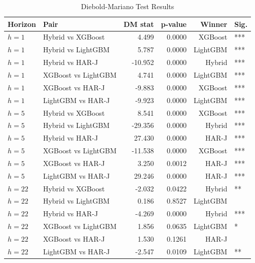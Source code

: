 \begin{table}[htbp]
\centering
\caption{Diebold-Mariano Test Results}
\label{tab:dm_tests}
\begin{tabular}{llrrrl}
\hline
Horizon & Pair & DM stat & p-value & Winner & Sig. \\
\hline
$h=1$ & Hybrid vs XGBoost & 4.499 & 0.0000 & XGBoost & *** \\
$h=1$ & Hybrid vs LightGBM & 5.787 & 0.0000 & LightGBM & *** \\
$h=1$ & Hybrid vs HAR-J & -10.952 & 0.0000 & Hybrid & *** \\
$h=1$ & XGBoost vs LightGBM & 4.741 & 0.0000 & LightGBM & *** \\
$h=1$ & XGBoost vs HAR-J & -9.883 & 0.0000 & XGBoost & *** \\
$h=1$ & LightGBM vs HAR-J & -9.923 & 0.0000 & LightGBM & *** \\
$h=5$ & Hybrid vs XGBoost & 8.541 & 0.0000 & XGBoost & *** \\
$h=5$ & Hybrid vs LightGBM & -29.356 & 0.0000 & Hybrid & *** \\
$h=5$ & Hybrid vs HAR-J & 27.430 & 0.0000 & HAR-J & *** \\
$h=5$ & XGBoost vs LightGBM & -11.538 & 0.0000 & XGBoost & *** \\
$h=5$ & XGBoost vs HAR-J & 3.250 & 0.0012 & HAR-J & *** \\
$h=5$ & LightGBM vs HAR-J & 29.246 & 0.0000 & HAR-J & *** \\
$h=22$ & Hybrid vs XGBoost & -2.032 & 0.0422 & Hybrid & ** \\
$h=22$ & Hybrid vs LightGBM & 0.186 & 0.8527 & LightGBM &  \\
$h=22$ & Hybrid vs HAR-J & -4.269 & 0.0000 & Hybrid & *** \\
$h=22$ & XGBoost vs LightGBM & 1.856 & 0.0635 & LightGBM & * \\
$h=22$ & XGBoost vs HAR-J & 1.530 & 0.1261 & HAR-J &  \\
$h=22$ & LightGBM vs HAR-J & -2.547 & 0.0109 & LightGBM & ** \\
\hline
\end{tabular}
\end{table}
